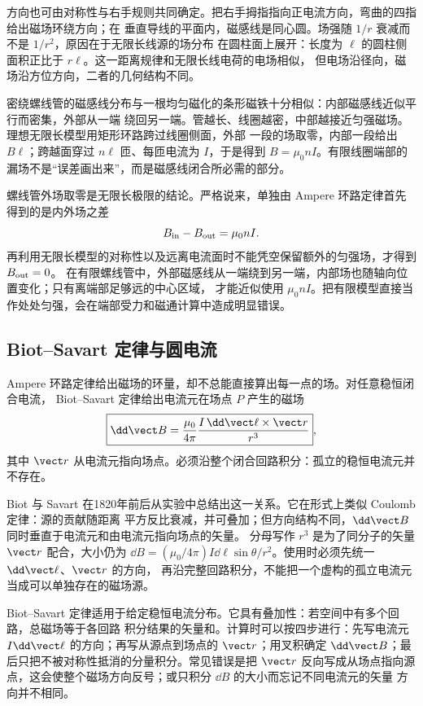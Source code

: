 方向也可由对称性与右手规则共同确定。把右手拇指指向正电流方向，弯曲的四指给出磁场环绕方向；在
垂直导线的平面内，磁感线是同心圆。场强随 $1/r$ 衰减而不是 $1/r^2$，原因在于无限长线源的场分布
在圆柱面上展开：长度为 $\ell$ 的圆柱侧面积正比于 $r\ell$。这一距离规律和无限长线电荷的电场相似，
但电场沿径向，磁场沿方位方向，二者的几何结构不同。

密绕螺线管的磁感线分布与一根均匀磁化的条形磁铁十分相似：内部磁感线近似平行而密集，外部从一端
绕回另一端。管越长、线圈越密，中部越接近匀强磁场。理想无限长模型用矩形环路跨过线圈侧面，外部
一段的场取零，内部一段给出 $B\ell$；跨越面穿过 $n\ell$ 匝、每匝电流为 $I$，于是得到
$B=\mu_0nI$。有限线圈端部的漏场不是“误差画出来”，而是磁感线闭合所必需的部分。

螺线管外场取零是无限长极限的结论。严格说来，单独由 Ampere 环路定律首先得到的是内外场之差
\begin{equation}
  B_{\rm in}-B_{\rm out}=\mu_0nI.
\end{equation}
再利用无限长模型的对称性以及远离电流面时不能凭空保留额外的匀强场，才得到 $B_{\rm out}=0$。
在有限螺线管中，外部磁感线从一端绕到另一端，内部场也随轴向位置变化；只有离端部足够远的中心区域，
才能近似使用 $\mu_0nI$。把有限模型直接当作处处匀强，会在端部受力和磁通计算中造成明显错误。

\wireSolenoidDiagram

\subsection*{Biot--Savart 定律与圆电流}

Ampere 环路定律给出磁场的环量，却不总能直接算出每一点的场。对任意稳恒闭合电流，
Biot--Savart 定律给出电流元在场点 $P$ 产生的磁场
\begin{equation}
  \boxed{\dd\vect B=\frac{\mu_0}{4\pi}
  \frac{I\,\dd\vect\ell\times\vect r}{r^3}},
\end{equation}
其中 $\vect r$ 从电流元指向场点。必须沿整个闭合回路积分：孤立的稳恒电流元并不存在。

Biot 与 Savart 在1820年前后从实验中总结出这一关系。它在形式上类似 Coulomb 定律：源的贡献随距离
平方反比衰减，并可叠加；但方向结构不同，$\dd\vect B$ 同时垂直于电流元和由电流元指向场点的矢量。
分母写作 $r^3$ 是为了同分子的矢量 $\vect r$ 配合，大小仍为
$\dd B=(\mu_0/4\pi)I\dd\ell\sin\theta/r^2$。使用时必须先统一 $\dd\vect\ell$、$\vect r$ 的方向，
再沿完整回路积分，不能把一个虚构的孤立电流元当成可以单独存在的磁场源。

Biot--Savart 定律适用于给定稳恒电流分布。它具有叠加性：若空间中有多个回路，总磁场等于各回路
积分结果的矢量和。计算时可以按四步进行：先写电流元 $I\dd\vect\ell$ 的方向；再写从源点到场点的
$\vect r$；用叉积确定 $\dd\vect B$；最后只把不被对称性抵消的分量积分。常见错误是把 $\vect r$
反向写成从场点指向源点，这会使整个磁场方向反号；或只积分 $\dd B$ 的大小而忘记不同电流元的矢量
方向并不相同。

